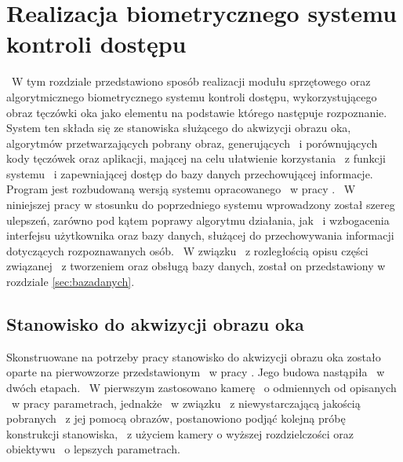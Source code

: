 \chapter{Realizacja biometrycznego systemu kontroli dostępu}
\label{cha:realizacja}
~W tym rozdziale przedstawiono sposób realizacji modułu sprzętowego oraz algorytmicznego biometrycznego systemu kontroli dostępu, wykorzystującego obraz tęczówki oka jako elementu na podstawie którego następuje rozpoznanie. System ten składa się ze stanowiska służącego do akwizycji obrazu oka, algorytmów przetwarzających pobrany obraz, generujących ~i porównujących kody tęczówek oraz aplikacji, mającej na celu ułatwienie korzystania ~z funkcji systemu ~i zapewniającej dostęp do bazy danych przechowującej informacje. Program jest rozbudowaną wersją systemu opracowanego ~w pracy \cite{Gl11}. ~W niniejszej pracy w stosunku do poprzedniego systemu wprowadzony został szereg ulepszeń, zarówno pod kątem poprawy algorytmu działania, jak ~i wzbogacenia interfejsu użytkownika oraz bazy danych, służącej do przechowywania informacji dotyczących rozpoznawanych osób. ~W związku ~z rozległością opisu części związanej ~z tworzeniem oraz obsługą bazy danych, został on przedstawiony w rozdziale \ref{sec:bazadanych}.

\section{Stanowisko do akwizycji obrazu oka}
\label{sec:stanowisko}
Skonstruowane na potrzeby pracy stanowisko do akwizycji obrazu oka zostało oparte na pierwowzorze przedstawionym ~w pracy \cite{Gl11}. Jego budowa  nastąpiła ~w dwóch etapach. ~W pierwszym zastosowano kamerę ~o odmiennych od opisanych ~w pracy \cite{Gl11} parametrach, jednakże ~w związku ~z niewystarczającą jakością pobranych ~z jej pomocą obrazów, postanowiono podjąć kolejną próbę konstrukcji stanowiska, ~z użyciem kamery o wyższej rozdzielczości oraz obiektywu ~o lepszych parametrach.

